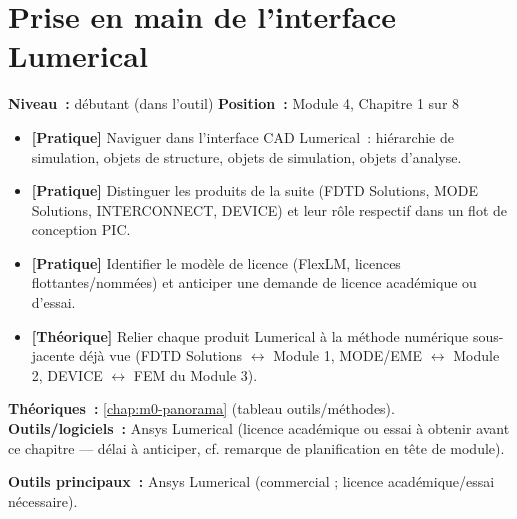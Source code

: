 
\chapter{Prise en main de l'interface Lumerical}
\label{chap:m4-interface}

\noindent\textbf{Niveau~:} débutant (dans l'outil) \hfill \textbf{Position~:} Module 4, Chapitre 1 sur 8

\begin{objectifs}
\begin{itemize}[leftmargin=1.4em]
  \item \textbf{[Pratique]} Naviguer dans l'interface CAD Lumerical~: hiérarchie de simulation, objets de structure, objets de simulation, objets d'analyse.
  \item \textbf{[Pratique]} Distinguer les produits de la suite (FDTD Solutions, MODE Solutions, INTERCONNECT, DEVICE) et leur rôle respectif dans un flot de conception PIC.
  \item \textbf{[Pratique]} Identifier le modèle de licence (FlexLM, licences flottantes/nommées) et anticiper une demande de licence académique ou d'essai.
  \item \textbf{[Théorique]} Relier chaque produit Lumerical à la méthode numérique sous-jacente déjà vue (FDTD Solutions $\leftrightarrow$ Module 1, MODE/EME $\leftrightarrow$ Module 2, DEVICE $\leftrightarrow$ FEM du Module 3).
\end{itemize}
\end{objectifs}

\begin{prerequis}
\textbf{Théoriques~:} \cref{chap:m0-panorama} (tableau outils/méthodes).\\
\textbf{Outils/logiciels~:} Ansys Lumerical (licence académique ou essai à obtenir avant ce chapitre — délai à anticiper, cf. remarque de planification en tête de module).
\end{prerequis}

\noindent\textbf{Outils principaux~:} Ansys Lumerical (commercial ; licence académique/essai nécessaire).

